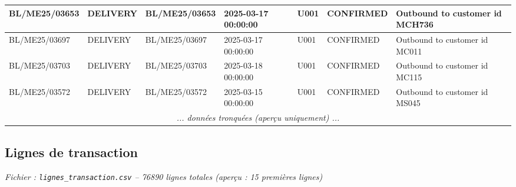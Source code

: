 \documentclass[a4paper,11pt]{article}
\begin{document}
\begin{landscape}
\begin{longtable}{|l|l|l|l|l|l|l|}
\rowcolor{rowgray} BL/ME25/03653 & DELIVERY & BL/ME25/03653 & 2025-03-17 00:00:00 & U001 & CONFIRMED & Outbound to customer id MCH736 \\ \hline
 BL/ME25/03697 & DELIVERY & BL/ME25/03697 & 2025-03-17 00:00:00 & U001 & CONFIRMED & Outbound to customer id MC011 \\ \hline
\rowcolor{rowgray} BL/ME25/03703 & DELIVERY & BL/ME25/03703 & 2025-03-18 00:00:00 & U001 & CONFIRMED & Outbound to customer id MC115 \\ \hline
 BL/ME25/03572 & DELIVERY & BL/ME25/03572 & 2025-03-15 00:00:00 & U001 & CONFIRMED & Outbound to customer id MS045 \\ \hline
\multicolumn{7}{|c|}{\textit{... données tronquées (aperçu uniquement) ...}} \\ \hline
\end{longtable}
\end{landscape}
\normalsize

\newpage

\subsection{Lignes de transaction}

\textit{Fichier : \texttt{lignes\_transaction.csv} -- 76890 lignes totales
 (aperçu : 15 premières lignes)
}
\end{document}
